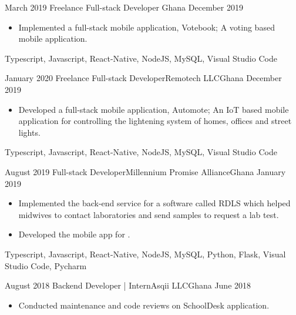 \begin{experiences}
  
  
    \experience
    {March 2019} {Freelance Full-stack Developer }{}{Ghana}
    {December 2019}    {
                      \begin{itemize}
                        \item Implemented a full-stack mobile application, Votebook; A voting based mobile application.
                      \end{itemize}
                    }
                    {Typescript, Javascript, React-Native, NodeJS, MySQL, Visual Studio Code}
  \emptySeparator
  
  
  
  \experience
    {January 2020}     {Freelance Full-stack Developer}{Remotech LLC}{Ghana}
    {December 2019}    {
                      \begin{itemize}
                        \item Developed a full-stack mobile application, Automote; An IoT based mobile application for controlling the lightening system of homes, offices and street lights.
                      \end{itemize}
                    }
                    {Typescript, Javascript, React-Native, NodeJS, MySQL, Visual Studio Code}
  \emptySeparator
  
  
  
   \experience
    {August 2019}     {Full-stack Developer}{Millennium Promise Alliance}{Ghana}
    {January 2019}    {
                      \begin{itemize}
                        \item Implemented the back-end service for a software called RDLS which helped midwives to contact laboratories and send samples to request a lab test.
                        
                        \item Developed the mobile app for {
                        }.
                      \end{itemize}
                    }
                    {Typescript, Javascript, React-Native, NodeJS, MySQL, Python, Flask, Visual Studio Code, Pycharm}
  \emptySeparator
 
 
  \experience
    {August 2018}     {Backend Developer | Intern}{Asqii LLC}{Ghana}
    {June 2018}    {
                      \begin{itemize}
                        \item Conducted maintenance and code reviews on SchoolDesk application.
                        

\end{itemize}}
\end{experiences}

